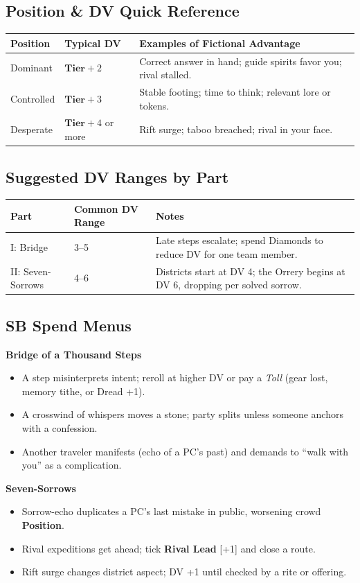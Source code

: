 \documentclass[11pt]{article}
\newcommand{\Clock}[2]{\textbf{#1} [#2]}
\newcommand{\Term}[1]{\textbf{#1}}
\newcommand{\Position}{\Term{Position}}
\newcommand{\Tier}{\Term{Tier}}
\begin{document}
\subsection*{Position \& DV Quick Reference}
\vspace{-0.5em}
\begin{tabularx}{\linewidth}{@{}l l X@{}}
\toprule
\textbf{Position} & \textbf{Typical DV} & \textbf{Examples of Fictional Advantage}\\
\midrule
Dominant & \(\Tier+2\) & Correct answer in hand; guide spirits favor you; rival stalled.\\
Controlled & \(\Tier+3\) & Stable footing; time to think; relevant lore or tokens.\\
Desperate & \(\Tier+4\) or more & Rift surge; taboo breached; rival in your face.\\
\bottomrule
\end{tabularx}

\subsection*{Suggested DV Ranges by Part}
\begin{tabularx}{\linewidth}{@{}l l X@{}}
\toprule
\textbf{Part} & \textbf{Common DV Range} & \textbf{Notes}\\
\midrule
I: Bridge & 3--5 & Late steps escalate; spend Diamonds to reduce DV for one team member.\\
II: Seven-Sorrows & 4--6 & Districts start at DV 4; the Orrery begins at DV 6, dropping per solved sorrow.\\
\bottomrule
\end{tabularx}

\subsection*{SB Spend Menus}
\noindent\textbf{Bridge of a Thousand Steps}
\begin{itemize}[leftmargin=*]
\item A step misinterprets intent; reroll at higher DV or pay a \emph{Toll} (gear lost, memory tithe, or Dread +1).
\item A crosswind of whispers moves a stone; party splits unless someone anchors with a confession.
\item Another traveler manifests (echo of a PC's past) and demands to ``walk with you'' as a complication.
\end{itemize}
\noindent\textbf{Seven-Sorrows}
\begin{itemize}[leftmargin=*]
\item Sorrow-echo duplicates a PC's last mistake in public, worsening crowd \Position{}.
\item Rival expeditions get ahead; tick \Clock{Rival Lead}{+1} and close a route.
\item Rift surge changes district aspect; DV +1 until checked by a rite or offering.
\end{itemize}
\end{document}
